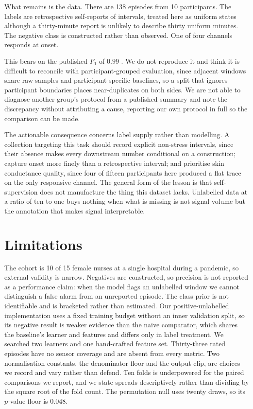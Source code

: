 What remains is the data. There are 138 episodes from 10 participants. The
labels are retrospective self-reports of intervals, treated here as uniform
states although a thirty-minute report is unlikely to describe thirty uniform
minutes. The negative class is constructed rather than observed. One of four
channels responds at onset.

This bears on the published $F_1$ of $0.99$ \cite{mathur2024}. We do not
reproduce it and think it is difficult to reconcile with participant-grouped
evaluation, since adjacent windows share raw samples and participant-specific
baselines, so a split that ignores participant boundaries places near-duplicates
on both sides. We are not able to diagnose another group's protocol from a
published summary and note the discrepancy without attributing a cause,
reporting our own protocol in full so the comparison can be made.

The actionable consequence concerns label supply rather than modelling. A
collection targeting this task should record explicit non-stress intervals,
since their absence makes every downstream number conditional on a
construction; capture onset more finely than a retrospective interval; and
prioritise skin conductance quality, since four of fifteen participants here
produced a flat trace on the only responsive channel. The general form of the
lesson is that self-supervision does not manufacture the thing this dataset
lacks. Unlabelled data at a ratio of ten to one buys nothing when what is
missing is not signal volume but the annotation that makes signal
interpretable.

\section{Limitations}

The cohort is 10 of 15 female nurses at a single hospital during a pandemic,
so external validity is narrow. Negatives are constructed, so precision is not
reported as a performance claim: when the model flags an unlabelled window we
cannot distinguish a false alarm from an unreported episode. The class prior is
not identifiable and is bracketed rather than estimated. Our positive-unlabelled
implementation uses a fixed training budget without an inner validation split,
so its negative result is weaker evidence than the naive comparator, which
shares the baseline's learner and features and differs only in label treatment.
We searched two learners and one hand-crafted feature set. Thirty-three rated
episodes have no sensor coverage and are absent from every metric. Two
normalisation constants, the denominator floor and the output clip, are choices
we record and vary rather than defend. Ten folds is underpowered for the paired
comparisons we report, and we state spreads descriptively rather than dividing
by the square root of the fold count. The permutation null uses twenty draws,
so its $p$-value floor is $0.048$.


